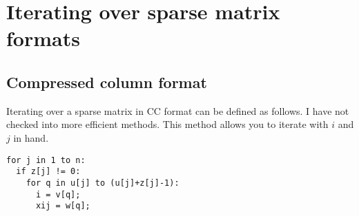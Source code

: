 \chapter{Iterating over sparse matrix formats}

\section{Compressed column format} 

Iterating over a sparse matrix in CC format can be defined as follows.
I have not checked into more efficient methods.  This method allows you
to iterate with $i$ and $j$ in hand.

\begin{verbatim}
for j in 1 to n:
  if z[j] != 0:
    for q in u[j] to (u[j]+z[j]-1):
      i = v[q];
      xij = w[q];
\end{verbatim}



